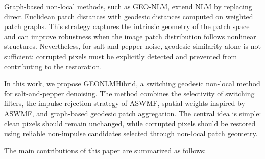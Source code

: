 \documentclass{ieeeaccess}
\begin{document}
Graph-based non-local methods, such as GEO-NLM, extend NLM by replacing direct Euclidean patch distances with geodesic distances computed on weighted patch graphs. This strategy captures the intrinsic geometry of the patch space and can improve robustness when the image patch distribution follows nonlinear structures. Nevertheless, for salt-and-pepper noise, geodesic similarity alone is not sufficient: corrupted pixels must be explicitly detected and prevented from contributing to the restoration.

In this work, we propose GEONLMHibrid, a switching geodesic non-local method for salt-and-pepper denoising. The method combines the selectivity of switching filters, the impulse rejection strategy of ASWMF, spatial weights inspired by ASWMF, and graph-based geodesic patch aggregation. The central idea is simple: clean pixels should remain unchanged, while corrupted pixels should be restored using reliable non-impulse candidates selected through non-local patch geometry.

The main contributions of this paper are summarized as follows:
\end{document}
